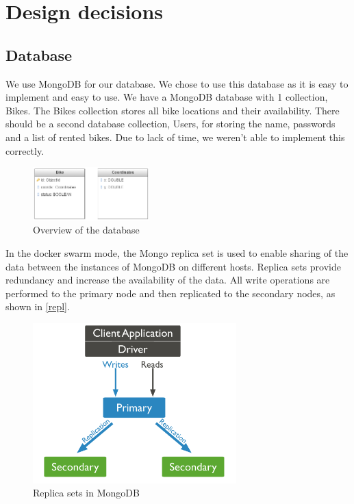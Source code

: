 \section{Design decisions}

\subsection{Database}
We use MongoDB for our database. We chose to use this database as it is easy to implement and easy to use. We have
a MongoDB database with 1 collection, Bikes. The Bikes collection stores all bike locations and their availability. There should be a second database collection, Users, for storing the name, passwords and a list of rented bikes. Due to lack of time, we weren't able to implement this correctly.

    \begin{figure}[H]
		\centering
		\includegraphics[width=0.4\textwidth]{images/db-structure.png}
		\caption{Overview of the database}
		\label{database}
	\end{figure}


In the docker swarm mode, the Mongo replica set is used to enable sharing of the data between the instances of MongoDB on different hosts. Replica sets provide redundancy and increase the availability of the data. All write operations are performed to the primary node and then replicated to the secondary nodes, as shown in \autoref{repl}.

    \begin{figure}[H]
		\centering
		\includegraphics[width=0.7\textwidth]{images/replication.png}
		\caption{Replica sets in MongoDB}
		\label{repl}
	\end{figure}


